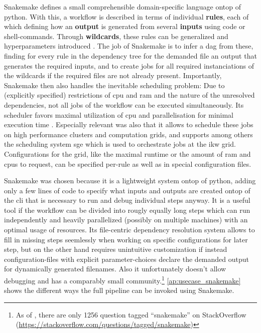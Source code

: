 Snakemake defines a small comprehensible domain-specific language ontop of python. With this, a workflow is described in terms of individual \textbf{rules}, each of which defining how an \textbf{output} is generated from several \textbf{inputs} using code or shell-commands. Through \textbf{wildcards}, these rules can be generalized and hyperparameters introduced \cite{Molder2021a}. The job of Snakemake is to infer a \gls{dag} from these, finding for every rule in the dependency tree for the demanded file an output that generates the required inputs, and to create jobs for all required instanciations of the wildcards if the required files are not already present. Importantly, Snakemake then also handles the inevitable scheduling problem: Due to (explicitly specified) restrictions of \acrshort{cpu} and \acrshort{ram} and the nature of the unresolved dependencies, not all jobs of the workflow can be executed simultaneously. Its scheduler favors maximal utilization of \acrshort{cpu} and parallelisation for minimal execution time \cite{Molder2021a}. Especially relevant was also that it allows to schedule these jobs on high performance clusters and computation grids, and supports among others the scheduling system \gls{sge} which is used to orchestrate jobs at the \gls{ikw} grid. Configurations for the grid, like the maximal runtime or the amount of \gls{ram} and \glspl{cpu} to request, can be specified per-rule as well as in special configuration files.

Snakemake was chosen because it is a lightweight system ontop of python, adding only a few lines of code to specify what inputs and outputs are created ontop of the \gls{cli} that is necessary to run and debug individual steps anyway. It is a useful tool if the workflow can be divided into rougly equally long steps which can run independently and heavily parallelized (possibly on multiple machines) with an optimal usage of resources. Its file-centric dependency resolution system allows to fill in missing steps seemlessly when working on specific configurations for later step, but on the other hand requires unintuitive customization if instead configuration-files with explicit parameter-choices declare the demanded output for dynamically generated filenames. Also it unfortunately doesn't allow debugging and has a comparably small community.\footnote{As of , there are only 1256 question tagged ``snakemake'' on StackOverflow (\url{https://stackoverflow.com/questions/tagged/snakemake})} \autoref{ap:usecase_snakemake} shows the different ways the full pipeline can be invoked using Snakemake.

